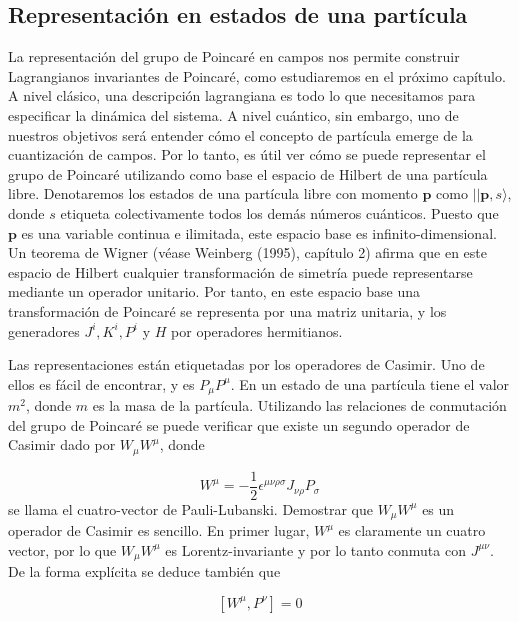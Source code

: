 {  \subsection{Representación en estados de una partícula}
  La representación del grupo de Poincaré en campos nos permite construir Lagrangianos invariantes de Poincaré, como estudiaremos en el próximo capítulo. A nivel clásico, una descripción lagrangiana es todo lo que necesitamos para especificar la dinámica del sistema. A nivel cuántico, sin embargo, uno de nuestros objetivos será entender cómo el concepto de partícula emerge de la cuantización de campos. Por lo tanto, es útil ver cómo se puede representar el grupo de Poincaré utilizando como base el espacio de Hilbert de una partícula libre. Denotaremos los estados de una partícula libre con momento $\mathbf{p}$ como $||\mathbf{p}, s\rangle$, donde $s$ etiqueta colectivamente todos los demás números cuánticos. Puesto que $\mathbf{p}$ es una variable continua e ilimitada, este espacio base es infinito-dimensional. Un teorema de Wigner (véase Weinberg (1995), capítulo 2) afirma que en este espacio de Hilbert cualquier transformación de simetría puede representarse mediante un operador unitario. \sidenote{} Por tanto, en este espacio base una transformación de Poincaré se representa por una matriz unitaria, y los generadores $J^{i}, K^{i}, P^{i}$ y $H$ por operadores hermitianos.

  Las representaciones están etiquetadas por los operadores de Casimir. Uno de ellos es fácil de encontrar, y es $P_{\mu} P^{\mu}$. En un estado de una partícula tiene el valor $m^{2}$, donde $m$ es la masa de la partícula. Utilizando las relaciones de conmutación del grupo de Poincaré se puede verificar que existe un segundo operador de Casimir dado por $W_{\mu} W^{\mu}$, donde

  \begin{equation*}
    W^{\mu}=-\frac{1}{2} \epsilon^{\mu \nu \rho \sigma} J_{\nu \rho} P_{\sigma} \tag{2.113}
    \end{equation*}
    se llama el cuatro-vector de Pauli-Lubanski. Demostrar que $W_{\mu} W^{\mu}$ es un operador de Casimir es sencillo. En primer lugar, $W^{\mu}$ es claramente un cuatro vector, por lo que $W_{\mu} W^{\mu}$ es Lorentz-invariante y por lo tanto conmuta con $J^{\mu \nu}$. De la forma explícita se deduce también que

    \begin{equation*}
      \left[W^{\mu}, P^{\nu}\right]=0 \tag{2.114}
      \end{equation*}

}
